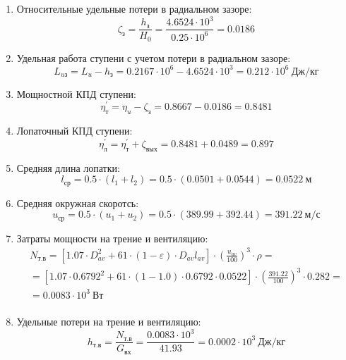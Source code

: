 \documentclass[a4paper,12pt]{article}
\begin{document}
\begin{enumerate}
        \item Относительные удельные потери в радиальном зазоре:
        \[
            \zeta_з = \frac{ h_з }{ H_0 } =
                \frac{ 4.6524 \cdot 10^3 }{ 0.25 \cdot 10^6 } =
            0.0186
        \]

        \item Удельная работа ступени с учетом потери в радиальном зазоре:
        \[
            L_{uз} = L_u - h_з = 0.2167 \cdot 10^6 -
                4.6524 \cdot 10^3 =
            0.212 \cdot 10^6 \ Дж/кг
        \]

        \item Мощностной КПД ступени:
        \[
            \eta_т^\prime = \eta_u - \zeta_з =
                0.8667 - 0.0186 = 0.8481
        \]

        \item Лопаточный КПД ступени:
        \[
            \eta_л^\prime = \eta_т^\prime + \zeta_{вых} =
                 0.8481 +  0.0489 =
            0.897
        \]

        \item Средняя длина лопатки:
        \[
            l_{ср} = 0.5 \cdot (l_1 + l_2) =
                0.5 \cdot (0.0501 + 0.0544) =
            0.0522\ м
        \]

        \item Средняя окружная скоротсь:
        \[
            u_{ср} = 0.5 \cdot (u_1 + u_2) =
                0.5 \cdot (389.99 + 392.44) =
            391.22\ м/с
        \]

        \item Затраты мощности на трение и вентиляцию:
        \begin{gather*}
            N_{т.в} = \left[
                    1.07 \cdot D_{av}^2 + 61 \cdot (1 - \varepsilon) \cdot D_{av} l_{av}
            \right] \cdot
            \left(
                \frac{ u_{av} }{ 100 }
            \right) ^ 3 \cdot
            \rho =\\
            = \left[
                1.07 \cdot 0.6792^2 +
                61 \cdot (1 - 1.0) \cdot
                0.6792 \cdot 0.0522
            \right] \cdot
            \left(
                \frac{ 391.22 }{ 100 }
            \right) ^ 3 \cdot
            0.282=\\
            = 0.0083 \cdot 10^3 \ Вт \\
        \end{gather*}

        \item Удельные потери на трение и вентиляцию:
        \[
            h_{т.в} = \frac{ N_{т.в} }{ G_{вх} } =
                \frac{
                    0.0083 \cdot 10^3
                }{
                    41.93
                }
            = 0.0002 \cdot 10^3 \ Дж/кг
        \]


\end{enumerate}
\end{document}
